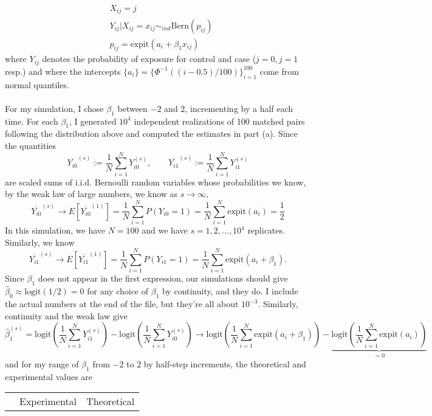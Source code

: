 \documentclass[11pt]{article}
\begin{document}
\begin{enumerate}
\begin{enumerate}
			\begin{align*}
				&X_{ij} = j \\
				&Y_{ij} | X_{ij}=x_{ij} \sim_{ind} \mathrm{Bern}(p_{ij}) \\
				&p_{ij} = \mathrm{expit}(a_i + \beta_1x_{ij})
			\end{align*}
			where $Y_{ij}$ denotes the probability of exposure for control and case ($j=0, j=1$ resp.) and where the intercepts $\{a_i\} = \{\Phi^{-1}((i-0.5)/100)\}_{i=1}^{100}$ come from normal quantiles.  
			\\ \\For my simulation, I chose $\beta_1$ between $-2$ and $2$, incrementing by a half each time. For each $\beta_1$, I generated $10^4$ independent realizations of 100 matched pairs following the distribution above and computed the estimates in part (a). Since the quantities
			\[
				 \overline{Y_{i0}}^{(s)} := \frac{1}{N}\sum_{i=1}^N Y_{i0}^{(s)},\quad\quad\overline{Y_{i1}}^{(s)} := \frac{1}{N}\sum_{i=1}^N Y_{i1}^{(s)}
			\] 
			are scaled sums of i.i.d. Bernoulli random variables whose probabilities we know, by the weak law of large numbers, we know as $s\to\infty$,
			\[
				\overline{Y_{i0}}^{(s)} \to E\left[\overline{Y_{i0}}^{(1)}\right] = \frac{1}{N}\sum_{i=1}^N P(Y_{i0}=1) = \frac{1}{N}\sum_{i=1}^N \mathrm{expit}(a_i) = \frac{1}{2}
			\]  In this simulation, we have $N=100$ and we have $s=1,2,\dotsc,10^4$ replicates. Similarly, we know
			\[
				\overline{Y_{i1}}^{(s)} \to E\left[\overline{Y_{i1}}^{(1)}\right] = \frac{1}{N}\sum_{i=1}^N P(Y_{i1}=1) = \frac{1}{N}\sum_{i=1}^N \mathrm{expit}(a_i+\beta_1).
			\]
			Since $\beta_1$ does not appear in the first expression, our simulations should give $\widehat\beta_0 \approx \mathrm{logit}(1/2) = 0$ for any choice of $\beta_1$ by continuity, and they do. I include the actual numbers at the end of the file, but they're all about $10^{-3}$. Similarly, continuity and the weak law give
			\[
				\widehat\beta_1^{(s)} = \mathrm{logit}\left(\frac{1}{N}	\sum_{i=1}^NY_{i1}^{(s)}\right) - \mathrm{logit}\left(\frac{1}{N}	\sum_{i=1}^NY_{i0}^{(s)}\right) \to \mathrm{logit}\left(\frac{1}{N}\sum_{i=1}^N \mathrm{expit}(a_i+\beta_1)\right) - \underbrace{\mathrm{logit}\left(\frac{1}{N}\sum_{i=1}^N \mathrm{expit}(a_i)\right)}_{=0}
			\]
			and for my range of $\beta_1$ from $-2$ to $2$ by half-step increments, the theoretical and experimental values are
			\begin{table}[H]
			\centering
			\begin{tabular}{|l|r|r|}
			\hline
				& Experimental & Theoretical \\

\end{tabular}
\end{table}
\end{enumerate}
\end{enumerate}
\end{document}
